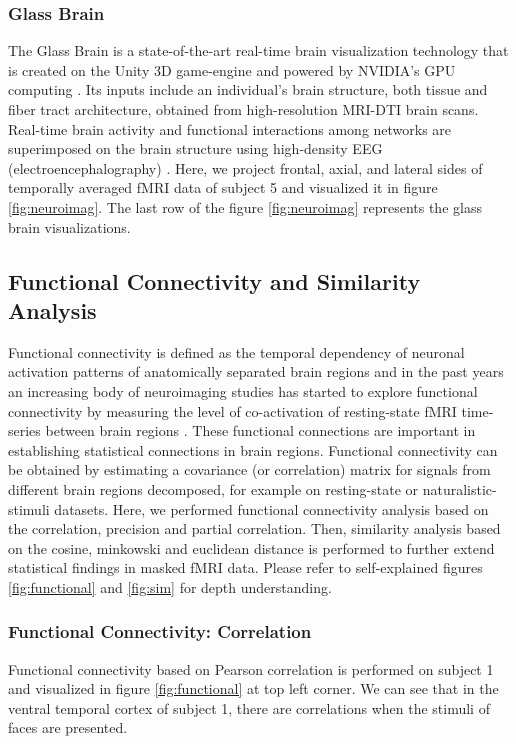 \documentclass[10pt, twocolumn, letterpaper]{article}
\begin{document}
\subsubsection{Glass Brain}
The Glass Brain is a state-of-the-art real-time brain visualization technology that is created on the Unity 3D game-engine and powered by NVIDIA’s GPU computing \cite{reddy2021pilot}. Its inputs include an individual’s brain structure, both tissue and fiber tract architecture, obtained from high-resolution MRI-DTI brain scans. Real-time brain activity and functional interactions among networks are superimposed on the brain structure using high-density EEG (electroencephalography) \cite{reddy2021pilot}. Here, we project frontal, axial, and lateral sides of temporally averaged fMRI data of subject 5 and visualized it in figure \ref{fig:neuroimag}. The last row of the figure \ref{fig:neuroimag} represents the glass brain visualizations. 

\subsection{Functional Connectivity and Similarity Analysis}
Functional connectivity is defined as the temporal dependency of neuronal activation patterns of anatomically separated brain regions and in the past years an increasing body of neuroimaging studies has started to explore functional connectivity by measuring the level of co-activation of resting-state fMRI time-series between brain regions \cite{van2010exploring}. These functional connections are important in establishing statistical connections in brain regions. Functional connectivity can be obtained by estimating a covariance (or correlation) matrix for signals from different brain regions decomposed, for example on resting-state or naturalistic-stimuli datasets. Here, we performed functional connectivity analysis based on the correlation, precision and partial correlation. Then, similarity analysis based on the cosine, minkowski and euclidean distance is performed to further extend statistical findings in masked fMRI data. Please refer to self-explained figures \ref{fig:functional} and \ref{fig:sim} for depth understanding.    


\subsubsection{Functional Connectivity: Correlation}
Functional connectivity based on Pearson correlation is performed on subject 1 and visualized in figure \ref{fig:functional} at top left corner. We can see that in the ventral temporal cortex of subject 1, there are correlations when the stimuli of faces are presented. 
\end{document}
